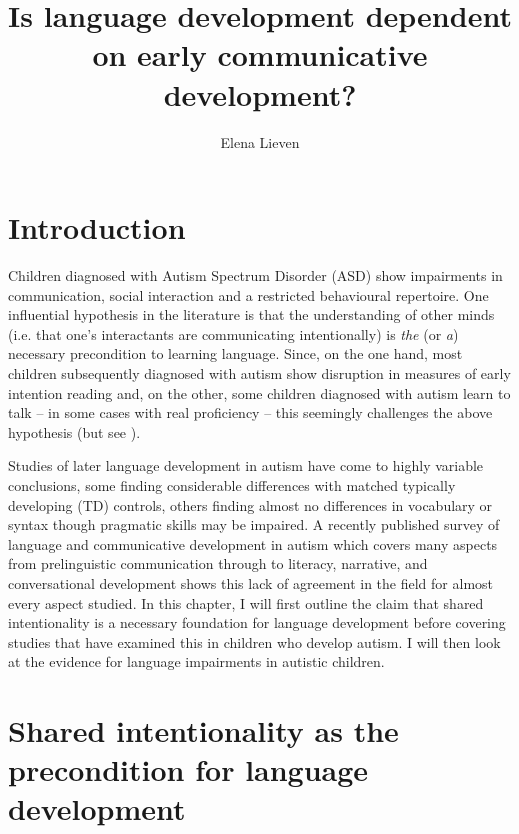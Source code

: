 \documentclass[output=paper]{langsci/langscibook}
\author{Elena Lieven\affiliation{ESRC International Centre for Language and Communicative Development \newline(LuCiD)
\\
Division of Human Communication, Development and Hearing
\\
University of Manchester}}
\title{Is language development dependent on early communicative development?}
\begin{document}
 
\section{Introduction}

   Children diagnosed with Autism Spectrum Disorder (ASD) show impairments in communication, social interaction and a restricted behavioural repertoire.  One influential hypothesis in the literature is that the understanding of other minds (i.e. that one’s interactants are communicating intentionally) is \textit{the} (or \textit{a}) necessary precondition to learning language.  Since, on the one hand, most children subsequently diagnosed with autism show disruption in measures of early intention reading and, on the other, some children diagnosed with autism learn to talk -- in some cases with real proficiency -- this seemingly challenges the above hypothesis (but see \citeauthor{Carpenter2000} ).  

Studies of later language development in autism have come to highly variable conclusions, some finding considerable differences with matched typically developing (TD) controls, others finding almost no differences in vocabulary or syntax though pragmatic skills may be impaired.  A recently published survey of language and communicative development in autism \citep{Arcuili2014} which covers many aspects from prelinguistic communication through to literacy, narrative, and conversational development shows this lack of agreement in the field for almost every aspect studied. In this chapter, I will first outline the claim that shared intentionality is a necessary foundation for language development before covering studies that have examined this in children who develop autism.  I will then look at the evidence for language impairments in autistic children.   

\section{Shared intentionality as the precondition for language development}
\end{document}
